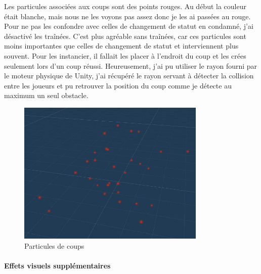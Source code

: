 \documentclass{article}
\begin{document}
Les particules associées aux coups sont des points rouges. Au début la couleur était blanche, mais nous ne les voyons pas assez donc je les ai passées au rouge. Pour ne pas les confondre avec celles de changement de statut en condamné, j'ai désactivé les traînées. C'est plus agréable sans traînées, car ces particules sont moins importantes que celles de changement de statut et interviennent plus souvent. Pour les instancier, il fallait les placer à l'endroit du coup et les crées seulement lors d'un coup réussi. Heureusement, j'ai pu utiliser le rayon fourni par le moteur physique de Unity, j'ai récupéré le rayon servant à détecter la collision entre les joueurs et pu retrouver la position du coup comme je détecte au maximum un seul obstacle.


\begin{figure}[H]
\centering
\includegraphics[width=0.8\textwidth]{cc/particles_hit.JPG}
\caption{Particules de coups}
\label{Particules de coups}
\end{figure}



\newpage
\paragraph{Effets visuels supplémentaires}
\end{document}
